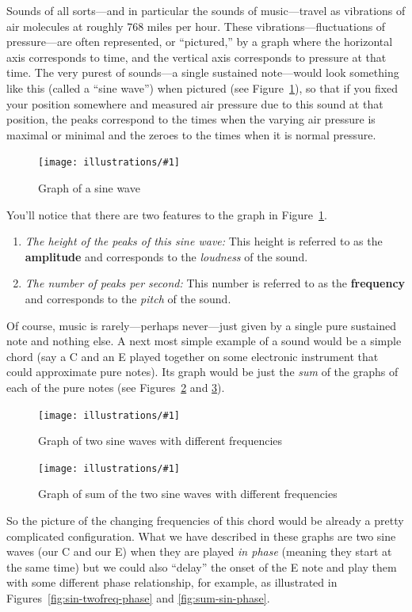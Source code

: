 \documentclass[openany]{book}
\newcommand{\ill}[3]{%
   \begin{figure}[H]%
   \vspace{-2ex}
   \centering%
   \texttt{[image: illustrations/\#1]}%
   \caption{#3}%
   \vspace{-2ex}
    \end{figure}}
\theoremstyle{plain}
\theoremstyle{definition}
\begin{document}
{Sounds of all sorts---and in particular the sounds of music---travel
as vibrations of air molecules at roughly 768 miles per hour. These
vibrations---fluctuations of pressure---are often represented, or
``pictured,'' by a graph where the horizontal axis corresponds to
time, and the vertical axis corresponds to pressure at that time.  The
very purest of sounds---a single sustained note---would look
something like this (called a ``sine wave'') when pictured (see
Figure~\ref{fig:sine}), so that if you fixed your position somewhere
and measured air pressure due to this sound at that position, the
peaks correspond to the times when the varying air pressure is maximal
or minimal and the zeroes to the times when it is normal pressure.

\ill{sin}{.7}{Graph of a sine wave\label{fig:sine}}

You'll notice that there are two features to the graph in Figure~\ref{fig:sine}.

\begin{enumerate}
\item {\em The height of the peaks of this sine wave:} This height is
  referred to as the {\bf amplitude} and corresponds to the {\em
    loudness} of the sound.
\item {\em The number of peaks per second:} This number is referred to
  as the {\bf frequency} and corresponds to the {\em pitch} of the
  sound.
\end{enumerate}


Of course, music is rarely---perhaps never---just given by a single
pure sustained note and nothing else. A next most simple example of a
sound would be a simple chord (say a C and an E played together on
some electronic instrument that could approximate pure notes). Its
graph would be just the {\em sum} of the graphs of each of the pure
notes (see Figures~\ref{fig:sinetwofreq} and \ref{fig:sinetwofreqsum}).


\ill{sin-twofreq}{0.6}{Graph of two sine waves with different frequencies\label{fig:sinetwofreq}}

\ill{sin-twofreq-sum}{.6}{Graph of sum of the two sine waves with different frequencies\label{fig:sinetwofreqsum}}

So the picture of the changing frequencies of this chord would be
already a pretty complicated configuration.  What we have described in
these graphs are two sine waves (our C and our E) when they are played
{\em in phase} (meaning they start at the same time) but we could
also ``delay'' the onset of the E note and play them with some
different phase relationship, for example, as illustrated
in Figures~\ref{fig:sin-twofreq-phase} and \ref{fig:sum-sin-phase}.

}
\end{document}
